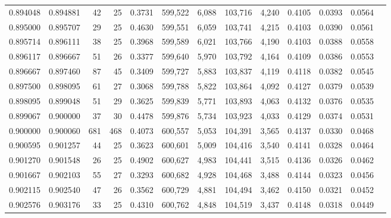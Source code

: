 \begin{tabular}{rrrrrrrrrrrrr}
0.894048 & 0.894881 &     42 &    25 &                                     0.3731 & 599,522 &   6,088 & 103,716 &   4,240 & 0.4105 & 0.0393 & 0.0564 \\
0.895000 & 0.895707 &     29 &    25 &                                     0.4630 & 599,551 &   6,059 & 103,741 &   4,215 & 0.4103 & 0.0390 & 0.0561 \\
0.895714 & 0.896111 &     38 &    25 &                                     0.3968 & 599,589 &   6,021 & 103,766 &   4,190 & 0.4103 & 0.0388 & 0.0558 \\
0.896117 & 0.896667 &     51 &    26 &                                     0.3377 & 599,640 &   5,970 & 103,792 &   4,164 & 0.4109 & 0.0386 & 0.0553 \\
0.896667 & 0.897460 &     87 &    45 &                                     0.3409 & 599,727 &   5,883 & 103,837 &   4,119 & 0.4118 & 0.0382 & 0.0545 \\
0.897500 & 0.898095 &     61 &    27 &                                     0.3068 & 599,788 &   5,822 & 103,864 &   4,092 & 0.4127 & 0.0379 & 0.0539 \\
0.898095 & 0.899048 &     51 &    29 &                                     0.3625 & 599,839 &   5,771 & 103,893 &   4,063 & 0.4132 & 0.0376 & 0.0535 \\
0.899067 & 0.900000 &     37 &    30 &                                     0.4478 & 599,876 &   5,734 & 103,923 &   4,033 & 0.4129 & 0.0374 & 0.0531 \\
0.900000 & 0.900060 &    681 &   468 &                                     0.4073 & 600,557 &   5,053 & 104,391 &   3,565 & 0.4137 & 0.0330 & 0.0468 \\
0.900595 & 0.901257 &     44 &    25 &                                     0.3623 & 600,601 &   5,009 & 104,416 &   3,540 & 0.4141 & 0.0328 & 0.0464 \\
0.901270 & 0.901548 &     26 &    25 &                                     0.4902 & 600,627 &   4,983 & 104,441 &   3,515 & 0.4136 & 0.0326 & 0.0462 \\
0.901667 & 0.902103 &     55 &    27 &                                     0.3293 & 600,682 &   4,928 & 104,468 &   3,488 & 0.4144 & 0.0323 & 0.0456 \\
0.902115 & 0.902540 &     47 &    26 &                                     0.3562 & 600,729 &   4,881 & 104,494 &   3,462 & 0.4150 & 0.0321 & 0.0452 \\
0.902576 & 0.903176 &     33 &    25 &                                     0.4310 & 600,762 &   4,848 & 104,519 &   3,437 & 0.4148 & 0.0318 & 0.0449 \\

\end{tabular}
